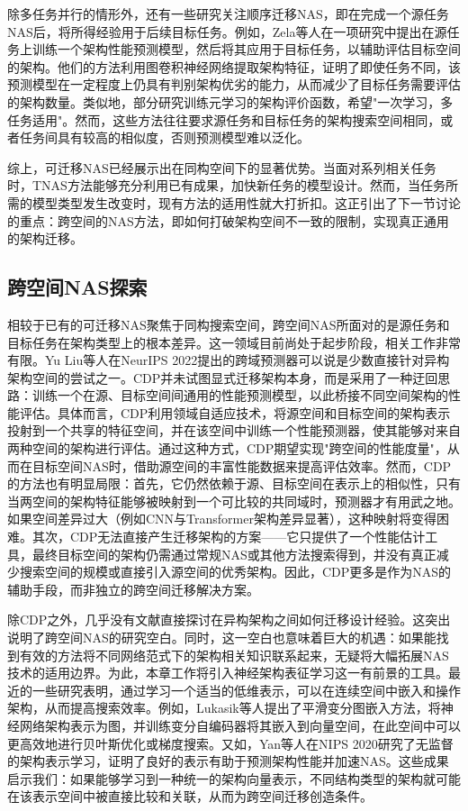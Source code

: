 \documentclass[../main.tex]{subfiles}
\begin{document}
除多任务并行的情形外，还有一些研究关注顺序迁移NAS，即在完成一个源任务NAS后，将所得经验用于后续目标任务。例如，Zela等人在一项研究中提出在源任务上训练一个架构性能预测模型，然后将其应用于目标任务，以辅助评估目标空间的架构。他们的方法利用图卷积神经网络提取架构特征，证明了即使任务不同，该预测模型在一定程度上仍具有判别架构优劣的能力，从而减少了目标任务需要评估的架构数量。类似地，部分研究训练元学习的架构评价函数，希望"一次学习，多任务适用"。然而，这些方法往往要求源任务和目标任务的架构搜索空间相同，或者任务间具有较高的相似度，否则预测模型难以泛化。

综上，可迁移NAS已经展示出在同构空间下的显著优势。当面对系列相关任务时，TNAS方法能够充分利用已有成果，加快新任务的模型设计。然而，当任务所需的模型类型发生改变时，现有方法的适用性就大打折扣。这正引出了下一节讨论的重点：跨空间的NAS方法，即如何打破架构空间不一致的限制，实现真正通用的架构迁移。

\subsection{跨空间NAS探索}

相较于已有的可迁移NAS聚焦于同构搜索空间，跨空间NAS所面对的是源任务和目标任务在架构类型上的根本差异。这一领域目前尚处于起步阶段，相关工作非常有限。Yu Liu等人在NeurIPS 2022提出的跨域预测器可以说是少数直接针对异构架构空间的尝试之一。CDP并未试图显式迁移架构本身，而是采用了一种迂回思路：训练一个在源、目标空间间通用的性能预测模型，以此桥接不同空间架构的性能评估。具体而言，CDP利用领域自适应技术，将源空间和目标空间的架构表示投射到一个共享的特征空间，并在该空间中训练一个性能预测器，使其能够对来自两种空间的架构进行评估。通过这种方式，CDP期望实现"跨空间的性能度量"，从而在目标空间NAS时，借助源空间的丰富性能数据来提高评估效率。然而，CDP的方法也有明显局限：首先，它仍然依赖于源、目标空间在表示上的相似性，只有当两空间的架构特征能够被映射到一个可比较的共同域时，预测器才有用武之地。如果空间差异过大（例如CNN与Transformer架构差异显著），这种映射将变得困难。其次，CDP无法直接产生迁移架构的方案——它只提供了一个性能估计工具，最终目标空间的架构仍需通过常规NAS或其他方法搜索得到，并没有真正减少搜索空间的规模或直接引入源空间的优秀架构。因此，CDP更多是作为NAS的辅助手段，而非独立的跨空间迁移解决方案。

除CDP之外，几乎没有文献直接探讨在异构架构之间如何迁移设计经验。这突出说明了跨空间NAS的研究空白。同时，这一空白也意味着巨大的机遇：如果能找到有效的方法将不同网络范式下的架构相关知识联系起来，无疑将大幅拓展NAS技术的适用边界。为此，本章工作将引入神经架构表征学习这一有前景的工具。最近的一些研究表明，通过学习一个适当的低维表示，可以在连续空间中嵌入和操作架构，从而提高搜索效率。例如，Lukasik等人提出了平滑变分图嵌入方法，将神经网络架构表示为图，并训练变分自编码器将其嵌入到向量空间，在此空间中可以更高效地进行贝叶斯优化或梯度搜索。又如，Yan等人在NIPS 2020研究了无监督的架构表示学习，证明了良好的表示有助于预测架构性能并加速NAS。这些成果启示我们：如果能够学习到一种统一的架构向量表示，不同结构类型的架构就可能在该表示空间中被直接比较和关联，从而为跨空间迁移创造条件。
\end{document}
